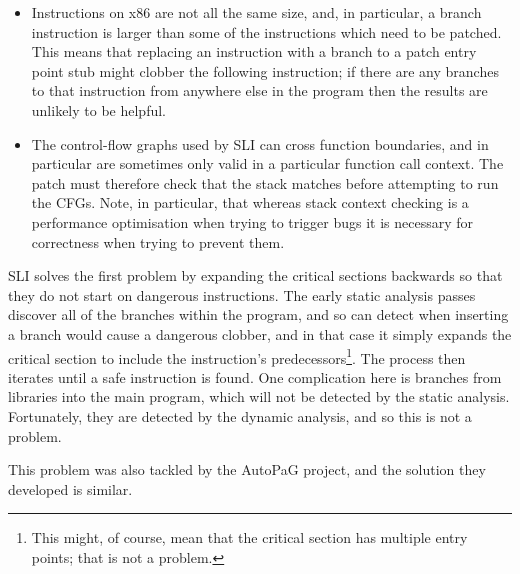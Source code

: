 \begin{itemize}
\item
  Instructions on x86 are not all the same size, and, in particular, a
  branch instruction is larger than some of the instructions which
  need to be patched.  This means that replacing an instruction with a
  branch to a patch entry point stub might clobber the following
  instruction; if there are any branches to that instruction from
  anywhere else in the program then the results are unlikely to be
  helpful.
\item
  The control-flow graphs used by SLI can cross function boundaries,
  and in particular are sometimes only valid in a particular function
  call context.  The patch must therefore check that the stack matches
  before attempting to run the CFGs.  Note, in particular, that
  whereas stack context checking is a performance optimisation when
  trying to trigger bugs it is necessary for correctness when trying
  to prevent them.
\end{itemize}

SLI solves the first problem by expanding the critical sections
backwards so that they do not start on dangerous instructions.  The
early static analysis passes discover all of the branches within the
program, and so can detect when inserting a branch would cause a
dangerous clobber, and in that case it simply expands the critical
section to include the instruction's predecessors\footnote{This might,
  of course, mean that the critical section has multiple entry points;
  that is not a problem.}.  The process then iterates until a safe
instruction is found.  One complication here is branches from libraries into
the main program, which will not be detected by the static analysis.
Fortunately, they are detected by the dynamic analysis, and so this is
not a problem.

This problem was also tackled by the AutoPaG project, and the solution
they developed is similar. 


